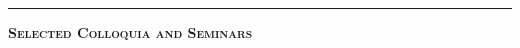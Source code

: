 \documentclass[12pt]{article}
\newcommand{\sectionheading}[1]
	{\bigskip %
	\noindent
	\hspace{-6.5mm}\textcolor{Gray}{\rule[.75mm]{21.5mm}{1mm}} %
	\hspace{.2mm}	%
	{\large{\textbf{\textsc{#1}}}} %
}
\newenvironment{date_section}
	{
	\vspace{-1ex}
	\leftmargini = 15ex
	 \begin{itemize}[
		 labelsep = *,
		 labelwidth = 9ex,
		 labelindent = 0ex,
		 itemindent = !,
		 font=\normalfont, 
		 align=parleft
		 ]
		{}
		\itemsep=-1.5mm}
	{\end{itemize}\vspace{-2ex}}
\newcommand{\yearmo}[2]{
	\item[ 
		{\makebox[1ex][r]{#1}}
		\hspace{1ex}
		{\makebox[1ex][l]{#2} }
		] }
\begin{document}
\begin{date_section}
			
			
			
			
			
			
			
			
	
		\end{date_section}
	
	\sectionheading{Selected Colloquia and  Seminars}%
	
\end{document}
